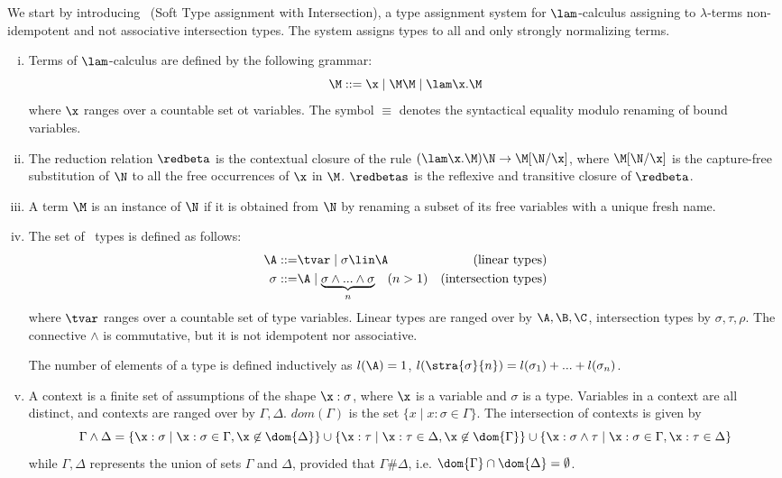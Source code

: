 We start by introducing \STI\ (Soft Type assignment with Intersection), a type assignment system for $\lam$-calculus assigning to $\lambda$-terms non-idempotent and not associative intersection types. The system assigns types to all and only strongly normalizing terms.

\begin{definition}
\begin{enumerate}[i)]
\item Terms of $\lam$-calculus are defined by the following grammar:
$$\M ::= \x \mid \M\M \mid \lam \x. \M$$
where $\x$ ranges over a countable set ot variables. The symbol $\equiv$ denotes the syntactical equality modulo renaming of bound variables.
\item The reduction relation $\redbeta$ is the contextual closure of the rule $(\lam \x. \M) \N \rightarrow \M[\N/\x]$,
where $\M[\N/\x]$ is the capture-free substitution of $\N$ to all the free occurrences of $\x$ in $\M$.  $\redbetas$ is the reflexive and transitive closure of $\redbeta$.

\item A term $\M$ is an instance of $\N$ if it is obtained from $\N$ by renaming a subset of its free variables with a unique fresh name.

\item The set of \STI\ types is defined as follows:
\begin{align*}
\A ::= & \tvar \mid \sigma \lin \A & \mbox{(linear types)}\\
\sigma ::= & \A \mid \underbrace{ \sigma \wedge ... \wedge \sigma}_n \quad (n > 1) & \mbox{(intersection types)}
\end{align*}
where $\tvar$ ranges over a countable set of type variables. Linear types are ranged over by $\A, \B, \C$, intersection types by 
$\sigma, \tau, \rho$.  The connective $\wedge$ is commutative, but it is not idempotent nor associative.

The number of elements of a type is defined inductively as $l(\A) = 1$, $l(\stra{\sigma}{n})= l(\sigma_{1}) + ... + l(\sigma_{n})$.

\item A context is a finite set of assumptions of the shape $\x: \sigma$, where $\x$ is a variable and $\sigma$ is a type. Variables in a context are all distinct, and
contexts are ranged over by $\Gamma, \Delta$. $dom(\Gamma)$ is the set $\{x \mid x:\sigma \in \Gamma \}$.
The intersection of contexts is given by
$$\Gamma \wedge \Delta = \{ \x : \sigma \mid \x : \sigma \in \Gamma, \x \not\in \dom{\Delta} \} \cup \{ \x : \tau \mid \x : \tau \in \Delta, \x \not\in \dom{\Gamma} \} \cup \{ \x : \sigma \wedge \tau \mid \x:\sigma \in \Gamma, \x:\tau \in \Delta \}$$
while $\Gamma, \Delta$ represents the union of sets $\Gamma$ and $\Delta$, provided that $\Gamma \# \Delta$, i.e. $\dom{\Gamma} \cap \dom{\Delta} = \emptyset$.


\end{enumerate}
\end{definition}

